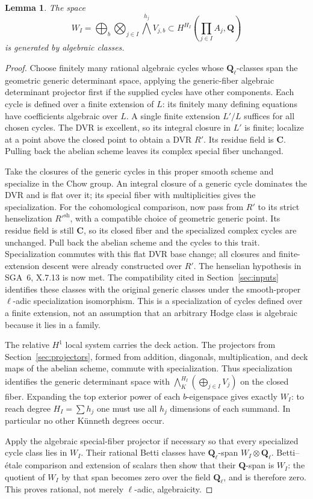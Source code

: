 \documentclass[11pt]{article}
\newtheorem{lemma}[theorem]{Lemma}
\theoremstyle{definition}
\newcommand{\Q}{\mathbf Q}
\newcommand{\C}{\mathbf C}
\begin{document}
\begin{lemma}\label{lem:specialization}
The space
\[
 W_I=\bigoplus_b\bigotimes_{j\in I}\bigwedge^{h_j}V_{j,b}
 \subset H^{H_I}\left(\prod_{j\in I} A_j,\Q\right)
\]
is generated by algebraic classes.
\end{lemma}
\begin{proof}
Choose finitely many rational algebraic cycles whose $\Q_\ell$-classes span the
geometric generic determinant space, applying the generic-fiber algebraic
determinant projector first if the supplied cycles have other components.
Each cycle is defined over a finite
extension of $L$: its finitely many defining equations have coefficients
algebraic over $L$. A single finite extension $L'/L$ suffices for all chosen
cycles. The DVR is excellent, so its integral closure in $L'$ is finite;
localize at a point above the closed point to obtain a DVR $R'$. Its residue
field is $\C$. Pulling back the abelian scheme leaves its complex special
fiber unchanged.

Take the closures of the generic cycles in this proper smooth scheme and
specialize in the Chow group. An integral closure of a generic cycle
dominates the DVR and is flat over it; its special fiber with multiplicities
gives the specialization. For the cohomological comparison, now pass from
$R'$ to its strict henselization $R'^{\mathrm{sh}}$, with a compatible choice
of geometric generic point. Its residue field is still $\C$, so its closed
fiber and the specialized complex cycles are unchanged. Pull back the abelian
scheme and the cycles to this trait. Specialization commutes with this flat
DVR base change; all closures and finite-extension descent were already
constructed over $R'$. The henselian hypothesis in SGA~6, X.7.13 is now met.
The compatibility cited in Section~\ref{sec:inputs}
identifies these classes with the original generic classes under the
smooth-proper $\ell$-adic specialization isomorphism. This is a specialization
of cycles defined over a finite extension, not an assumption that an arbitrary
Hodge class is algebraic because it lies in a family.

The relative $H^1$ local system carries the deck action. The projectors from
Section~\ref{sec:projectors}, formed from addition, diagonals, multiplication,
and deck maps of the abelian scheme, commute with specialization. Thus
specialization identifies the generic determinant space with
$\bigwedge_K^{H_I}(\bigoplus_{j\in I}V_j)$ on the closed fiber. Expanding the
top exterior power of each $b$-eigenspace gives exactly $W_I$: to reach degree
$H_I=\sum h_j$ one must use all $h_j$ dimensions of each summand. In
particular no other K\"unneth degrees occur.

Apply the algebraic special-fiber projector if necessary so that every
specialized cycle class lies in $W_I$. Their rational Betti classes have
$\Q_\ell$-span $W_I\otimes\Q_\ell$. Betti--\'etale comparison and extension
of scalars then show that their $\Q$-span is $W_I$: the quotient of $W_I$ by
that span becomes zero over the field $\Q_\ell$, and is therefore zero.
This proves rational, not merely $\ell$-adic, algebraicity.
\end{proof}
\end{document}
